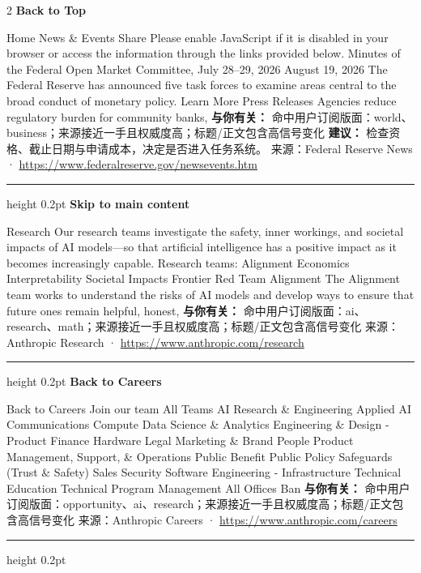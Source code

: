\documentclass[10.5pt]{ctexart}
\begin{document}
\begin{multicols}{2}
{\large\bfseries Back to Top}\par
Home News \& Events Share Please enable JavaScript if it is disabled in your browser or access the information through the links provided below. Minutes of the Federal Open Market Committee, July 28–29, 2026 August 19, 2026 The Federal Reserve has announced five task forces to examine areas central to the broad conduct of monetary policy. Learn More Press Releases Agencies reduce regulatory burden for community banks,
\textbf{与你有关：} 命中用户订阅版面：world、business；来源接近一手且权威度高；标题/正文包含高信号变化
\textbf{建议：} 检查资格、截止日期与申请成本，决定是否进入任务系统。
{\footnotesize\color{ormuted} 来源：Federal Reserve News · \url{https://www.federalreserve.gov/newsevents.htm}}
\vspace{2mm}
\hrule height 0.2pt
\vspace{2mm}
{\large\bfseries Skip to main content}\par
Research Our research teams investigate the safety, inner workings, and societal impacts of AI models—so that artificial intelligence has a positive impact as it becomes increasingly capable. Research teams: Alignment Economics Interpretability Societal Impacts Frontier Red Team Alignment The Alignment team works to understand the risks of AI models and develop ways to ensure that future ones remain helpful, honest, 
\textbf{与你有关：} 命中用户订阅版面：ai、research、math；来源接近一手且权威度高；标题/正文包含高信号变化
{\footnotesize\color{ormuted} 来源：Anthropic Research · \url{https://www.anthropic.com/research}}
\vspace{2mm}
\hrule height 0.2pt
\vspace{2mm}
{\large\bfseries Back to Careers}\par
Back to Careers Join our team All Teams AI Research \& Engineering Applied AI Communications Compute Data Science \& Analytics Engineering \& Design - Product Finance Hardware Legal Marketing \& Brand People Product Management, Support, \& Operations Public Benefit Public Policy Safeguards (Trust \& Safety) Sales Security Software Engineering - Infrastructure Technical Education Technical Program Management All Offices Ban
\textbf{与你有关：} 命中用户订阅版面：opportunity、ai、research；来源接近一手且权威度高；标题/正文包含高信号变化
{\footnotesize\color{ormuted} 来源：Anthropic Careers · \url{https://www.anthropic.com/careers}}
\vspace{2mm}
\hrule height 0.2pt
\vspace{2mm}

\end{multicols}
\end{document}
